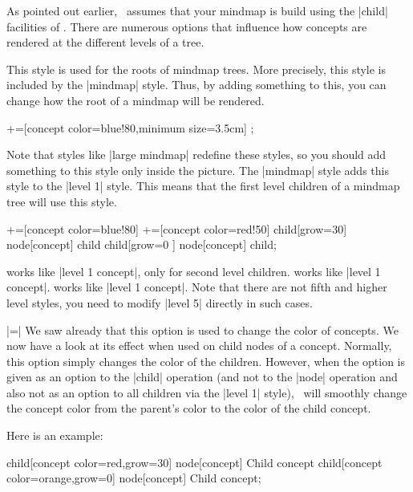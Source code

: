 As pointed out earlier, \tikzname\ assumes that your mindmap is build
using the |child| facilities of \tikzname. There are numerous options
that influence how concepts are rendered at the different levels of a
tree. 

\begin{itemize}
  This style is used for the roots of mindmap trees. More precisely,
  this style is included by the |mindmap| style. Thus, by adding
  something to this, you can change how the root of a mindmap will be
  rendered.
\begin{codeexample}[]
+=[concept color=blue!80,minimum size=3.5cm]    
\tikz[mindmap] ;
\end{codeexample}

  Note that styles like |large mindmap| redefine these styles, so you
  should add something to this style only inside the picture.
  The |mindmap| style adds this style to the |level 1| style. This
  means that the first level children of a mindmap tree will use this
  style. 
\begin{codeexample}[]
+=[concept color=blue!80]    
+=[concept color=red!50]    
\tikz[mindmap]
    child[grow=30] {node[concept] {child}}
    child[grow=0 ] {node[concept] {child}};
\end{codeexample}
  works like |level 1 concept|, only for second level children. 
  works like |level 1 concept|.
  works like |level 1 concept|. Note that there are not fifth and
  higher level styles, you need to modify |level 5| directly in such
  cases. 
  
  |=|
  We saw already that this option is used to change the color of
  concepts. We now have a look at its effect when used on child nodes
  of a concept. Normally, this option simply changes the color of the
  children. However, when the option is given as an option to the
  |child| operation (and not to the |node| operation and also not as
  an option to all children via the |level 1| style), \tikzname\ will
  smoothly change the concept color from the parent's color to the
  color of the child concept. 

  Here is an example:
\begin{codeexample}[]
\tikz[mindmap,concept color=blue!80]
    child[concept color=red,grow=30] {node[concept] {Child concept}}
    child[concept color=orange,grow=0]  {node[concept] {Child concept}};
\end{codeexample}


\end{itemize}
